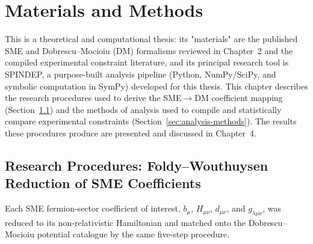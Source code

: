 \chapter{Materials and Methods}
\label{ch:methods}

This is a theoretical and computational thesis: its "materials" are the
published SME and Dobrescu--Mocioiu (DM) formalisms reviewed in Chapter~2
and the compiled experimental constraint literature, and its principal
research tool is SPINDEP, a purpose-built analysis pipeline (Python,
NumPy/SciPy, and symbolic computation in SymPy) developed for this thesis.
This chapter describes the research procedures used to derive the
SME$\to$DM coefficient mapping (Section~\ref{sec:procedure}) and the
methods of analysis used to compile and statistically compare experimental
constraints (Section~\ref{sec:analysis-methods}). The results these
procedures produce are presented and discussed in Chapter~4.

\section{Research Procedures: Foldy--Wouthuysen Reduction of SME Coefficients}
\label{sec:procedure}

Each SME fermion-sector coefficient of interest, $b_\mu$, $H_{\mu\nu}$,
$d_{\mu\nu}$, and $g_{\lambda\mu\nu}$, was reduced to its non-relativistic Hamiltonian and matched
onto the Dobrescu--Mocioiu potential catalogue by the same five-step
procedure.

